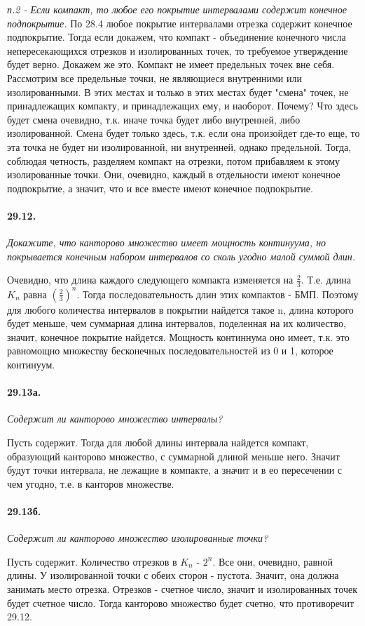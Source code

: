 \documentclass{book}
\begin{document}
\textit{п.2 - Если компакт, то любое его покрытие интервалами содержит конечное подпокрытие.} По 28.4 любое покрытие интервалами отрезка содержит конечное подпокрытие. Тогда если докажем, что компакт - объединение конечного числа непересекающихся отрезков и изолированных точек, то требуемое утверждение будет верно. Докажем же это. Компакт не имеет предельных точек вне себя. Рассмотрим все предельные точки, не являющиеся внутренними или изолированными. В этих местах и только в этих местах будет "смена" \text{} точек, не принадлежащих компакту, и принадлежащих ему, и наоборот. Почему? Что здесь будет смена очевидно, т.к. иначе точка будет либо внутренней, либо изолированной. Смена будет только здесь, т.к. если она произойдет где-то еще, то эта точка не будет ни изолированной, ни внутренней, однако предельной. Тогда, соблюдая четность, разделяем компакт на отрезки, потом прибавляем к этому изолированные точки. Они, очевидно, каждый в отдельности имеют конечное подпокрытие, а значит, что и все вместе имеют конечное подпокрытие.

\paragraph{29.12.}
\textit{Докажите, что канторово множество имеет мощность континуума, но покрывается конечным набором интервалов со сколь угодно малой суммой длин.}

Очевидно, что длина каждого следующего компакта изменяется на $\frac{2}{3}$. Т.е. длина $K_n$ равна $(\frac{2}{3})^n$. Тогда последовательность длин этих компактов - БМП. Поэтому для любого количества интервалов в покрытии найдется такое n, длина которого будет меньше, чем суммарная длина интервалов, поделенная на их количество, значит, конечное покрытие найдется. Мощность континнума оно имеет, т.к. это равномощно множеству бесконечных последовательностей из 0 и 1, которое континуум.

\paragraph{29.13а.}
\textit{Содержит ли канторово множество интервалы?}

Пусть содержит. Тогда для любой длины интервала найдется компакт, образующий канторово множество, с суммарной длиной меньше него. Значит будут точки интервала, не лежащие в компакте, а значит и в ео пересечении с чем угодно, т.е. в канторов множестве.

\paragraph{29.13б.}
\textit{Содержит ли канторово множество изолированные точки?}

Пусть содержит. Количество отрезков в $K_n$ - $2^n$. Все они, очевидно, равной длины. У изолированной точки с обеих сторон - пустота. Значит, она должна занимать место отрезка. Отрезков - счетное число, значит и изолированных точек будет счетное число. Тогда канторово множество будет счетно, что противоречит 29.12.
\end{document}
